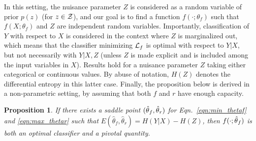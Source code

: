 \documentclass[twocolumn,superscriptaddress,aps]{revtex4-1}
\theoremstyle{plain}
\newtheorem{proposition}[theorem]{Proposition}
\begin{document}
In this setting, the nuisance parameter $Z$ is considered as a random variable
of prior $p(z)$ (for $z \in {\cal Z}$), and our goal is to find a function
$f(\cdot;\theta_f)$ such that $f(X;\theta_f)$ and $Z$ are independent random
variables.   Importantly, classification of $Y$ with respect to $X$ is
considered in the context where $Z$ is marginalized out, which means that the
classifier minimizing ${\cal L}_f$ is optimal with respect to $Y|X$, but not
necessarily with $Y|X,Z$ (unless $Z$ is made explicit and is included among the
input variables in $X$). Results hold for a nuisance parameter $Z$ taking either
categorical or continuous values. By abuse of notation, $H(Z)$ denotes the
differential entropy in this latter case. Finally, the  proposition below is
derived in a non-parametric setting, by assuming that both $f$ and $r$ have
enough capacity.

\begin{proposition}\label{prop:2}
If there exists a saddle point $(\smash{\hat\theta}_f, \smash{\hat\theta}_r)$
for Eqn.~\ref{eqn:min_thetaf} and \ref{eqn:max_thetar} such that
$E(\hat\theta_f, \hat\theta_r) = H({Y|X}) - H(Z)$, then
$f(\cdot;\smash{\hat\theta}_f)$ is both an optimal classifier and a pivotal
quantity.
\end{proposition}
\end{document}
